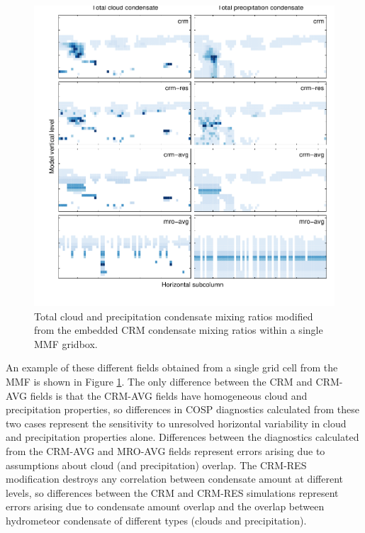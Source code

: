 \documentclass[letter]{article}
\begin{document}
\begin{figure}
\centering
\includegraphics{test_subgrid.pdf}
\caption{Total cloud and precipitation condensate mixing ratios modified from the embedded CRM condensate mixing ratios within a single MMF gridbox.}
\label{subgrid_fields}
\end{figure}

An example of these different fields obtained from a single grid cell from the MMF is shown in Figure \ref{subgrid_fields}. The only difference between the CRM and CRM-AVG fields is that the CRM-AVG fields have homogeneous cloud and precipitation properties, so differences in COSP diagnostics calculated from these two cases represent the sensitivity to unresolved horizontal variability in cloud and precipitation properties alone. Differences between the diagnostics calculated from the CRM-AVG and MRO-AVG fields represent errors arising due to assumptions about cloud (and precipitation) overlap. The CRM-RES modification destroys any correlation between condensate amount at different levels, so differences between the CRM and CRM-RES simulations represent errors arising due to condensate amount overlap and the overlap between hydrometeor condensate of different types (clouds and precipitation).
\end{document}
